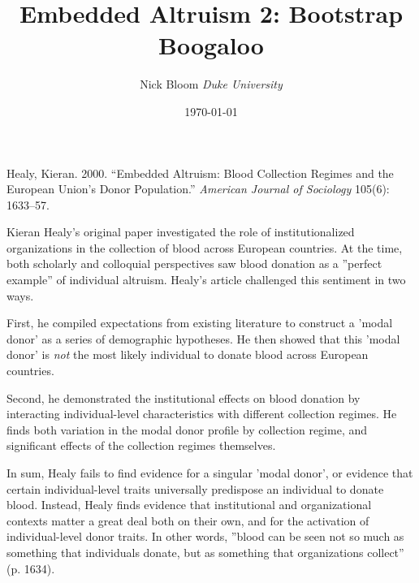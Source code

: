 \documentclass[11pt,article,oneside]{memoir}
\date{\today}
\begin{document}
 
\fontsize{11}{15}\selectfont

\title{\bigskip \bigskip Embedded Altruism 2: Bootstrap Boogaloo}
 
\author{\small Nick Bloom\vspace{0.05in} \newline\small\emph{Duke University}}




\pagestyle{kjh}

\maketitle



Healy, Kieran. 2000. “Embedded Altruism: Blood Collection Regimes and the European Union's Donor Population.” \emph{American Journal of Sociology} 105(6): 1633–57.

\vspace{0.25in}

Kieran Healy's original paper investigated the role of institutionalized organizations in
the collection of blood across European countries. At the time, both scholarly and colloquial perspectives saw blood donation as a ''perfect example'' of individual altruism. Healy's article challenged this sentiment in two ways.

First, he compiled expectations from existing literature to construct a
'modal donor' as a series of demographic hypotheses. He then showed that this 'modal donor' is \emph{not} the most likely individual to donate blood across European countries.

Second, he demonstrated the institutional effects on blood donation by interacting individual-level characteristics with different collection
regimes. He finds both variation in the modal donor profile by
collection regime, and significant effects of the collection regimes
themselves.

In sum, Healy fails to find evidence for a singular 'modal donor', or evidence that certain individual-level traits universally predispose an individual to donate blood. Instead, Healy finds evidence that institutional and organizational contexts matter a great deal both on their own, and for the activation of individual-level donor traits. In other words, ''blood can be seen not so much as something that individuals donate, but as something that organizations collect'' (p. 1634).
\end{document}
